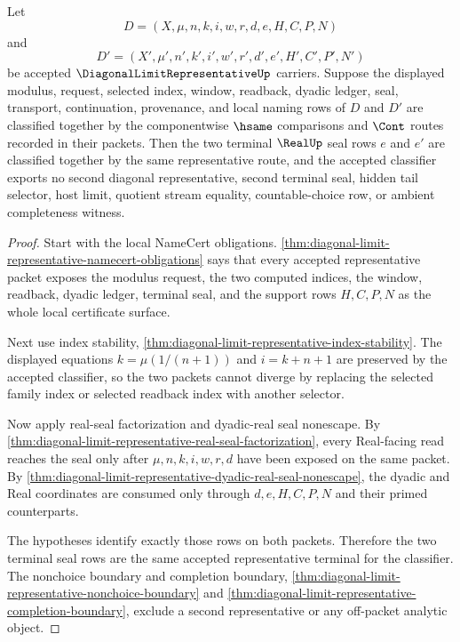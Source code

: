 \begin{theorem}
\label{thm:diagonal-limit-representative-terminal-uniqueness}
Let
$$
D=(X,\mu,n,k,i,w,r,d,e,H,C,P,N)
$$
and
$$
D'=(X',\mu',n',k',i',w',r',d',e',H',C',P',N')
$$
be accepted $\DiagonalLimitRepresentativeUp$ carriers. Suppose the displayed modulus, request, selected index, window, readback, dyadic ledger, seal, transport, continuation, provenance, and local naming rows of $D$ and $D'$ are classified together by the componentwise $\hsame$ comparisons and $\Cont$ routes recorded in their packets. Then the two terminal $\RealUp$ seal rows $e$ and $e'$ are classified together by the same representative route, and the accepted classifier exports no second diagonal representative, second terminal seal, hidden tail selector, host limit, quotient stream equality, countable-choice row, or ambient completeness witness.
\end{theorem}
\begin{proof}
Start with the local NameCert obligations. \autoref{thm:diagonal-limit-representative-namecert-obligations} says that every accepted representative packet exposes the modulus request, the two computed indices, the window, readback, dyadic ledger, terminal seal, and the support rows $H,C,P,N$ as the whole local certificate surface.

Next use index stability, \autoref{thm:diagonal-limit-representative-index-stability}. The displayed equations $k=\mu(1/(n+1))$ and $i=k+n+1$ are preserved by the accepted classifier, so the two packets cannot diverge by replacing the selected family index or selected readback index with another selector.

Now apply real-seal factorization and dyadic-real seal nonescape. By \autoref{thm:diagonal-limit-representative-real-seal-factorization}, every Real-facing read reaches the seal only after $\mu,n,k,i,w,r,d$ have been exposed on the same packet. By \autoref{thm:diagonal-limit-representative-dyadic-real-seal-nonescape}, the dyadic and Real coordinates are consumed only through $d,e,H,C,P,N$ and their primed counterparts.

The hypotheses identify exactly those rows on both packets. Therefore the two terminal seal rows are the same accepted representative terminal for the classifier. The nonchoice boundary and completion boundary, \autoref{thm:diagonal-limit-representative-nonchoice-boundary} and \autoref{thm:diagonal-limit-representative-completion-boundary}, exclude a second representative or any off-packet analytic object.
\end{proof}

